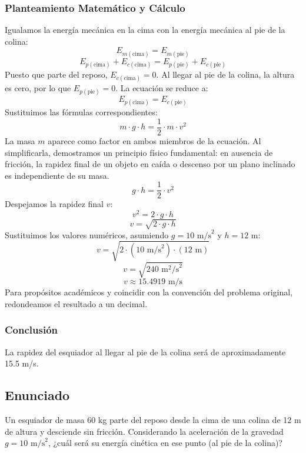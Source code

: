 \documentclass[12pt,a4paper]{article}
\begin{document}
\subsubsection*{Planteamiento Matemático y Cálculo}
Igualamos la energía mecánica en la cima con la energía mecánica al pie de la colina:
$$E_{m(\text{cima})} = E_{m(\text{pie})}$$
$$E_{p(\text{cima})} + E_{c(\text{cima})} = E_{p(\text{pie})} + E_{c(\text{pie})}$$
Puesto que parte del reposo, $E_{c(\text{cima})} = 0$. Al llegar al pie de la colina, la altura es cero, por lo que $E_{p(\text{pie})} = 0$. La ecuación se reduce a:
$$E_{p(\text{cima})} = E_{c(\text{pie})}$$
Sustituimos las fórmulas correspondientes:
$$m \cdot g \cdot h = \frac{1}{2} \cdot m \cdot v^2$$
La masa $m$ aparece como factor en ambos miembros de la ecuación. Al simplificarla, demostramos un principio físico fundamental: en ausencia de fricción, la rapidez final de un objeto en caída o descenso por un plano inclinado es independiente de su masa.
$$g \cdot h = \frac{1}{2} \cdot v^2$$
Despejamos la rapidez final $v$:
$$v^2 = 2 \cdot g \cdot h$$
$$v = \sqrt{2 \cdot g \cdot h}$$
Sustituimos los valores numéricos, asumiendo $g = 10 \text{ m/s}^2$ y $h = 12 \text{ m}$:
$$v = \sqrt{2 \cdot (10 \text{ m/s}^2) \cdot (12 \text{ m})}$$
$$v = \sqrt{240 \text{ m}^2\text{/s}^2}$$
$$v \approx 15.4919 \text{ m/s}$$
Para propósitos académicos y coincidir con la convención del problema original, redondeamos el resultado a un decimal.

\subsubsection*{Conclusión}
La rapidez del esquiador al llegar al pie de la colina será de aproximadamente 15.5 m/s.

\newpage
\subsection*{Enunciado}
Un esquiador de masa 60 kg parte del reposo desde la cima de una colina de 12 m de altura y desciende sin fricción. Considerando la aceleración de la gravedad $g = 10 \text{ m/s}^2$, ¿cuál será su energía cinética en ese punto (al pie de la colina)?

\begin{center}
\end{center}
\end{document}
